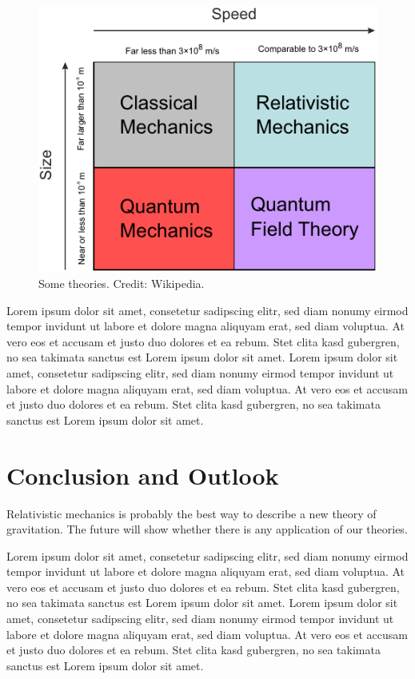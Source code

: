 \documentclass[a4paper,]{article}
\begin{document}
\begin{figure}
\centering
\includegraphics{../fig/theories.pdf}
\caption{Some theories. Credit: Wikipedia.}\label{fig:theories}
\end{figure}

Lorem ipsum dolor sit amet, consetetur sadipscing elitr, sed diam nonumy eirmod tempor invidunt ut labore et dolore magna aliquyam erat, sed diam voluptua. At vero eos et accusam et justo duo dolores et ea rebum. Stet clita kasd gubergren, no sea takimata sanctus est Lorem ipsum dolor sit amet. Lorem ipsum dolor sit amet, consetetur sadipscing elitr, sed diam nonumy eirmod tempor invidunt ut labore et dolore magna aliquyam erat, sed diam voluptua. At vero eos et accusam et justo duo dolores et ea rebum. Stet clita kasd gubergren, no sea takimata sanctus est Lorem ipsum dolor sit amet.

\section{Conclusion and Outlook}\label{conclusion-and-outlook}

Relativistic mechanics is probably the best way to describe a new theory of gravitation.
The future will show whether there is any application of our theories.

Lorem ipsum dolor sit amet, consetetur sadipscing elitr, sed diam nonumy eirmod tempor invidunt ut labore et dolore magna aliquyam erat, sed diam voluptua. At vero eos et accusam et justo duo dolores et ea rebum. Stet clita kasd gubergren, no sea takimata sanctus est Lorem ipsum dolor sit amet. Lorem ipsum dolor sit amet, consetetur sadipscing elitr, sed diam nonumy eirmod tempor invidunt ut labore et dolore magna aliquyam erat, sed diam voluptua. At vero eos et accusam et justo duo dolores et ea rebum. Stet clita kasd gubergren, no sea takimata sanctus est Lorem ipsum dolor sit amet.
\appendix
\end{document}
